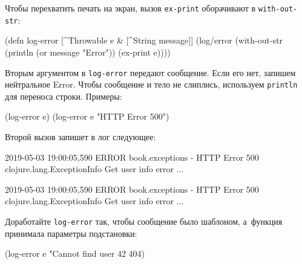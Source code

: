 Чтобы перехватить печать на экран, вызов \verb|ex-print| оборачивают в
\verb|with-out-str|:

\begin{english}
  \begin{clojure}
(defn log-error
  [^Throwable e & [^String message]]
  (log/error
   (with-out-str
     (println (or message "Error"))
     (ex-print e))))
  \end{clojure}
\end{english}

Вторым аргументом в \verb|log-error| передают сообщение. Если его нет, запишем
нейтральное Error. Чтобы сообщение и тело не слиплись, используем
\verb|println| для переноса строки. Примеры:

\begin{english}
  \begin{clojure}
(log-error e)
(log-error e "HTTP Error 500")
  \end{clojure}
\end{english}

Второй вызов запишет в лог следующее:

\ifx\DEVICETYPE\MOBILE

\begin{english}
  \begin{text}
2019-05-03 19:00:05,590 ERROR
book.exceptions - HTTP Error 500
clojure.lang.ExceptionInfo
  Get user info error
  ...
  \end{text}
\end{english}

\else

\begin{english}
  \begin{text}
2019-05-03 19:00:05,590 ERROR book.exceptions - HTTP Error 500
clojure.lang.ExceptionInfo
  Get user info error
  ...
  \end{text}
\end{english}

\fi

Доработайте \verb|log-error| так, чтобы сообщение было шаблоном, а~функция
принимала параметры подстановки:

\ifx\DEVICETYPE\MOBILE

\begin{english}
  \begin{clojure}
(log-error e
  "Cannot find user %
  42 404)
  \end{clojure}
\end{english}

